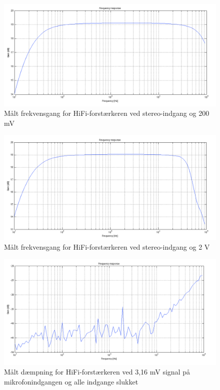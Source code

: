 \begin{figure}[h]
\centering
\includegraphics[width=\textwidth]{maalerapporter/final/stereo/final_stereo_200mv_frekvensgang.png}
\caption{Målt frekvensgang for HiFi-forstærkeren ved stereo-indgang og 200 mV}
\label{maalerapport_final7}
\end{figure}

\begin{figure}[h]
\centering
\includegraphics[width=\textwidth]{maalerapporter/final/stereo/final_stereo_2v_frekvensgang.png}
\caption{Målt frekvensgang for HiFi-forstærkeren ved stereo-indgang og 2 V}
\label{maalerapport_final8}
\end{figure}

\begin{figure}[h]
\centering
\includegraphics[width=\textwidth]{maalerapporter/final/daempning/final_daempning_mic_3,16mv_alloff.png}
\caption{Målt dæmpning for HiFi-forstærkeren ved 3,16 mV signal på mikrofonindgangen og alle indgange slukket}
\label{maalerapport_final9}
\end{figure}

